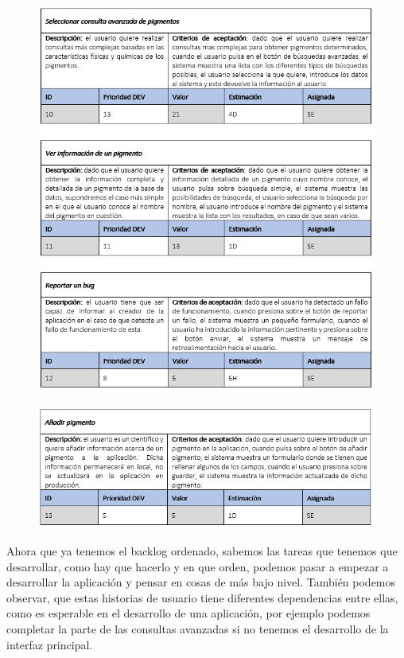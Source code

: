 \begin{figure}[H]
    \centering
    \includegraphics[scale=0.8]{imagenes/diseno/us1012.png}
    \label{fig:us1012}
\end{figure}

\begin{figure}[H]
    \centering
    \includegraphics[scale=0.8]{imagenes/diseno/usTrece.png}
    \label{fig:usTrece}
\end{figure}

Ahora que ya tenemos el backlog ordenado, sabemos las tareas que tenemos que desarrollar, como hay que hacerlo y en que orden, podemos pasar a empezar a desarrollar la aplicación y pensar en cosas de más bajo nivel. También podemos observar, que estas historias de usuario tiene diferentes dependencias entre ellas, como es esperable en el desarrollo de una aplicación, por ejemplo podemos completar la parte de las consultas avanzadas si no tenemos el desarrollo de la interfaz principal. 

